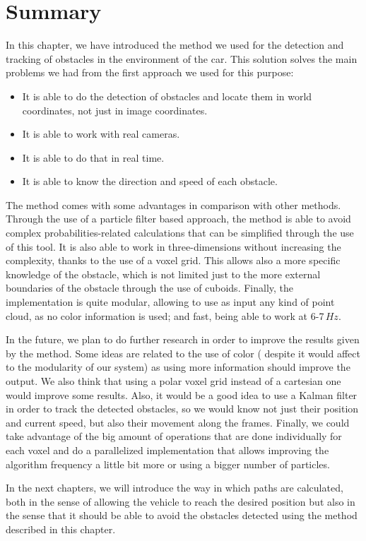 \section{Summary}\label{ch:chapter05_03}
 
In this chapter, we have introduced the method we used for the detection and tracking of obstacles in the environment of the car. This solution solves the main problems we had from the first approach we used for this purpose:
\begin{itemize}
 \item It is able to do the detection of obstacles and locate them in world coordinates, not just in image coordinates.
 \item It is able to work with real cameras.
 \item It is able to do that in real time.
 \item It is able to know the direction and speed of each obstacle.
\end{itemize}

The method comes with some advantages in comparison with other methods. Through the use of a particle filter based approach, the method is able to avoid complex probabilities-related calculations that can be simplified through the use of this tool. It is also able to work in three-dimensions without increasing the complexity, thanks to the use of a voxel grid. This allows also a more specific knowledge of the obstacle, which is not limited just to the more external boundaries of the obstacle through the use of cuboids. Finally, the implementation is quite modular, allowing to use as input any kind of point cloud, as no color information is used; and fast, being able to work at 6-7\,$Hz$.

In the future, we plan to do further research in order to improve the results given by the method. Some ideas are related to the use of color ( despite it would affect to the modularity of our system) as using more information should improve the output. We also think that using a polar voxel grid instead of a cartesian one would improve some results. Also, it would be a good idea to use a Kalman filter in order to track the detected obstacles, so we would know not just their position and current speed, but also their movement along the frames. Finally, we could take advantage of the big amount of operations that are done individually for each voxel and do a parallelized implementation that allows improving the algorithm frequency a little bit more or using a bigger number of particles.

In the next chapters, we will introduce the way in which paths are calculated, both in the sense of allowing the vehicle to reach the desired position but also in the sense that it should be able to avoid the obstacles detected using the method described in this chapter.
 
 
 
 